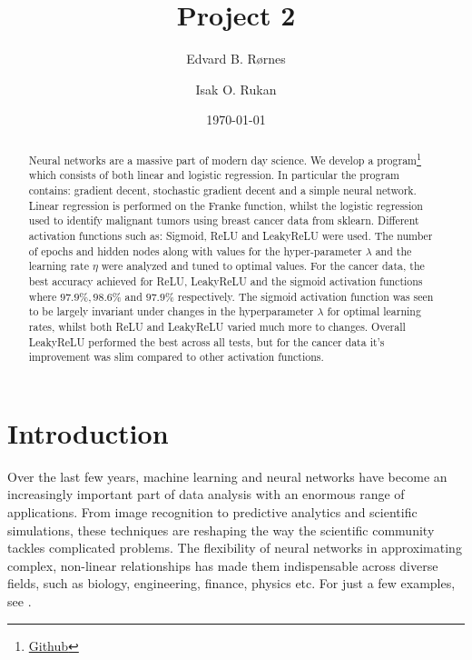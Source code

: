 \documentclass[%
reprint,
amsmath,amssymb,
aps,
]{revtex4-2}
\begin{document}
	
\title{Project 2}
\author{Edvard B. Rørnes}
\author{Isak O. Rukan}
\date{\today}

\begin{abstract}
	Neural networks are a massive part of modern day science. We develop a program\footnote{\href{https://github.com/EdvardRornes/FYS-STK4155/tree/main/Project1}{Github}} which consists of both linear and logistic regression. In particular the program contains: gradient decent, stochastic gradient decent and a simple neural network. Linear regression is performed on the Franke function, whilst the logistic regression used to identify malignant tumors using breast cancer data from sklearn. Different activation functions such as: Sigmoid, ReLU and LeakyReLU were used. The number of epochs and hidden nodes along with values for the hyper-parameter $\lambda$ and the learning rate $\eta$ were analyzed and tuned to optimal values. For the cancer data, the best accuracy achieved for ReLU, LeakyReLU and the sigmoid activation functions where $97.9\%,98.6\%$ and $97.9\%$ respectively. The sigmoid activation function was seen to be largely invariant under changes in the hyperparameter $\lambda$ for optimal learning rates, whilst both ReLU and LeakyReLU varied much more to changes. Overall LeakyReLU performed the best across all tests, but for the cancer data it's improvement was slim compared to other activation functions.
\end{abstract}

\maketitle

\section{Introduction}
Over the last few years, machine learning and neural networks have become an increasingly important part of data analysis with an enormous range of applications. From image recognition to predictive analytics and scientific simulations, these techniques are reshaping the way the scientific community tackles complicated problems. The flexibility of neural networks in approximating complex, non-linear relationships has made them indispensable across diverse fields, such as biology, engineering, finance, physics etc. For just a few examples, see \cite{dawid2023modernapplicationsmachinelearning,thapar2023applicationsmachinelearningmodelling,mohammadi2022applicationsmachinelearninghealthcare}.
\end{document}
